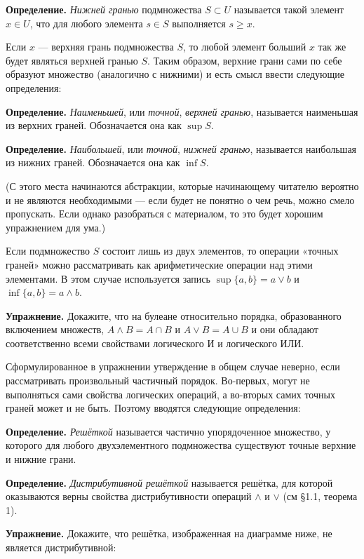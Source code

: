 {\bfseries Определение.} {\slshape Нижней гранью} подмножества $S\subset U$ называется такой элемент $x\in U$, что для любого элемента $s\in S$ выполняется $s \ge x$.

Если $x$ — верхняя грань подмножества $S$, то любой элемент больший $x$ так же будет являться верхней гранью $S$. Таким образом, верхние грани сами по себе образуют множество (аналогично с нижними) и есть смысл ввести следующие определения:

{\bfseries Определение.} {\slshape Наименьшей}, или {\slshape точной}, {\slshape верхней гранью}, называется наименьшая из верхних граней. Обозначается она как $\sup S$.

{\bfseries Определение.} {\slshape Наибольшей}, или {\slshape точной}, {\slshape нижней гранью}, называется наибольшая из нижних граней. Обозначается она как $\inf S$.

(С этого места начинаются абстракции, которые начинающему читателю вероятно и не являются необходимыми — если будет не понятно о чем речь, можно смело пропускать. Если однако разобраться с материалом, то это будет хорошим упражнением для ума.)

Если подмножество $S$ состоит лишь из двух элементов, то операции «точных граней» можно рассматривать как арифметические операции над этими элементами. В этом случае используется запись $\sup\{a, b\} = a\vee b$ и $\inf\{a, b\} = a\wedge b$.

{\bfseries Упражнение.} Докажите, что на булеане относительно порядка, образованного включением множеств, $A\wedge B = A\cap B$ и $A\vee B = A \cup B$ и они обладают соответственно всеми свойствами логического И и логического ИЛИ.

Сформулированное в упражнении утверждение в общем случае неверно, если рассматривать произвольный частичный порядок. Во-первых, могут не выполняться сами свойства логических операций, а во-вторых самих точных граней может и не быть. Поэтому вводятся следующие определения:

{\bfseries Определение.} {\slshape Решёткой} называется частично упорядоченное множество, у которого для любого двухэлементного подмножества существуют точные верхние и нижние грани.

{\bfseries Определение.} {\slshape Дистрибутивной решёткой} называется решётка, для которой оказываются верны свойства дистрибутивности операций $\wedge$ и $\vee$ (см §1.1, теорема 1).

{\bfseries Упражнение.} Докажите, что решётка, изображенная на диаграмме ниже, не является дистрибутивной:

